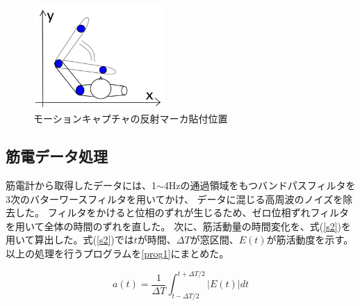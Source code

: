 \documentclass{jsarticle}
\begin{document}
\begin{figure}[htb]
  \begin{center}
    \includegraphics[width=5cm]{karada.png}
    \caption{モーションキャプチャの反射マーカ貼付位置}
    \label{karada2}
  \end{center}
\end{figure}


\subsection{筋電データ処理}
筋電計から取得したデータには、1$\sim$4Hzの通過領域をもつバンドパスフィルタを3次のバターワースフィルタを用いてかけ、
データに混じる高周波のノイズを除去した。
フィルタをかけると位相のずれが生じるため、ゼロ位相ずれフィルタを用いて全体の時間のずれを直した。
次に、筋活動量の時間変化を、式(\ref{s2})を用いて算出した。式(\ref{s2})では$t$が時間、$\Delta T$が窓区間、$E(t)$が筋活動度を示す。以上の処理を行うプログラムを\ref{prog1}にまとめた。



\begin{equation}
  a(t)=\frac{1}{\Delta T}\int_{t-\Delta T/2}^{t+\Delta T/2}|E(t)|dt 
  \label{s2}
\end{equation}
\end{document}
